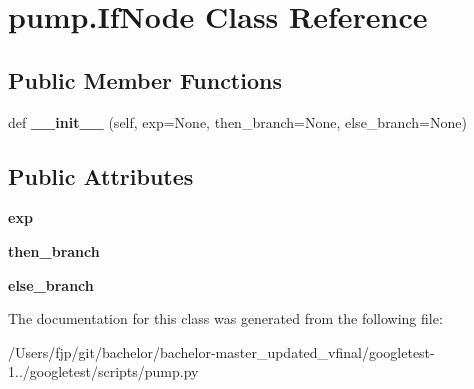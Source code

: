 \hypertarget{classpump_1_1_if_node}{}\section{pump.\+If\+Node Class Reference}
\label{classpump_1_1_if_node}
\subsection*{Public Member Functions}
\begin{DoxyCompactItemize}
\item 
\mbox{\label{classpump_1_1_if_node_ab8bff21c18d60b461f7b6fa9dfa59f7c}} 
def {\bfseries \+\_\+\+\_\+init\+\_\+\+\_\+} (self, exp=None, then\+\_\+branch=None, else\+\_\+branch=None)
\end{DoxyCompactItemize}
\subsection*{Public Attributes}
\begin{DoxyCompactItemize}
\item 
\mbox{\label{classpump_1_1_if_node_a92042e4262196ffd7366350539f512d8}} 
{\bfseries exp}
\item 
\mbox{\label{classpump_1_1_if_node_aa9e2e488564629f8dc0d64d165a19ffa}} 
{\bfseries then\+\_\+branch}
\item 
\mbox{\label{classpump_1_1_if_node_a12e422b16ed4291f15cd95cd6e7f81eb}} 
{\bfseries else\+\_\+branch}
\end{DoxyCompactItemize}


The documentation for this class was generated from the following file\+:\begin{DoxyCompactItemize}
\item 
/\+Users/fjp/git/bachelor/bachelor-\/master\+\_\+updated\+\_\+vfinal/googletest-\/1../googletest/scripts/pump.\+py\end{DoxyCompactItemize}
